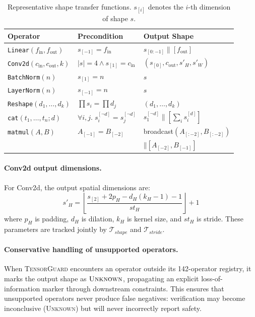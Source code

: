 \documentclass[10pt]{article}
\newcommand{\tguard}{\textsc{TensorGuard}}
\newcommand{\Tshape}{\mathcal{T}_{\mathit{shape}}}
\newcommand{\Tstride}{\mathcal{T}_{\mathit{stride}}}
\theoremstyle{plain}
\theoremstyle{definition}
\theoremstyle{remark}
\begin{document}
\begin{table}[t]
\centering
\caption{Representative shape transfer functions.
  $s_{[i]}$ denotes the $i$-th dimension of shape $s$.}
\label{tab:transfer}
\small
\begin{tabular}{@{}lll@{}}
\toprule
\textbf{Operator} & \textbf{Precondition} & \textbf{Output Shape} \\
\midrule
\texttt{Linear}$(f_\text{in}, f_\text{out})$ &
  $s_{[-1]} = f_\text{in}$ &
  $s_{[0:-1]} \mathbin\| [f_\text{out}]$ \\
\texttt{Conv2d}$(c_\text{in}, c_\text{out}, k)$ &
  $|s| = 4 \land s_{[1]} = c_\text{in}$ &
  $(s_{[0]}, c_\text{out}, s'_H, s'_W)$ \\
\texttt{BatchNorm}$(n)$ &
  $s_{[1]} = n$ &
  $s$ \\
\texttt{LayerNorm}$(n)$ &
  $s_{[-1]} = n$ &
  $s$ \\
\texttt{Reshape}$(d_1, \ldots, d_k)$ &
  $\prod s_i = \prod d_j$ &
  $(d_1, \ldots, d_k)$ \\
\texttt{cat}$(t_1, \ldots, t_n; d)$ &
  $\forall i,j.\; s_i^{[\neg d]} = s_j^{[\neg d]}$ &
  $s_1^{[\neg d]} \mathbin\| [\sum_i s_i^{[d]}]$ \\
\texttt{matmul}$(A, B)$ &
  $A_{[-1]} = B_{[-2]}$ &
  broadcast$(A_{[:-2]}, B_{[:-2]})$\\
  & & $\mathbin\| [A_{[-2]}, B_{[-1]}]$ \\
\bottomrule
\end{tabular}
\end{table}

\paragraph{Conv2d output dimensions.}
For Conv2d, the output spatial dimensions are:
\[
  s'_H = \left\lfloor \frac{s_{[2]} + 2p_H - d_H(k_H - 1) - 1}
    {st_H} \right\rfloor + 1
\]
where $p_H$ is padding, $d_H$ is dilation, $k_H$ is kernel size,
and $st_H$ is stride.  These parameters are tracked jointly by
$\Tshape$ and $\Tstride$.

\paragraph{Conservative handling of unsupported operators.}
When \tguard{} encounters an operator outside its 142-operator
registry, it marks the output shape as $\textsc{Unknown}$,
propagating an explicit loss-of-information marker through
downstream constraints.  This ensures that unsupported operators
never produce false negatives: verification may become
inconclusive (\textsc{Unknown}) but will never incorrectly report safety.
\end{document}
